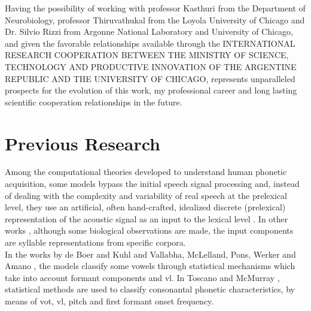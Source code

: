 \documentclass[11pt,a4paper]{article}
\begin{document}
Having the possibility of working with professor
Kasthuri from the Department of Neurobiology,
professor Thiruvathukal from the  Loyola University of Chicago and
Dr. Silvio Rizzi from Argonne National Laboratory and University of Chicago,
and given the favorable relationships available through the
INTERNATIONAL RESEARCH COOPERATION BETWEEN THE MINISTRY OF SCIENCE,
TECHNOLOGY AND PRODUCTIVE INNOVATION
OF THE ARGENTINE REPUBLIC
AND
THE UNIVERSITY OF CHICAGO,
represents unparalleled prospects for the
evolution of this work, my professional career
and long lasting scientific cooperation
relationships in the future. \\

























\section{Previous Research}

Among the computational theories developed to understand
human phonetic acquisition, some models bypass the initial
speech signal processing and,
instead of dealing with the complexity and variability of real speech
at the prelexical level, they use an artificial, often hand-crafted, 
idealized discrete (prelexical) representation of the acoustic
signal as an input to the lexical level \cite{scharenborg_2010}.
In other works \cite{dominey_2000}, although some biological observations are made,
the input components are syllable representations from specific corpora.\\

In the works by de Boer and Kuhl \cite{boer_2003} and Vallabha, McLelland, Pons,
Werker and Amano \cite{vallabha_2007}, the models classify some vowels
through statistical mechanisms which take into account formant components
and \gls{vl}.
In Toscano and McMurray \cite{toscano_2010},
statistical methods are used to classify consonantal phonetic
characteristics, by means of \gls{vot},
\gls{vl}, pitch and first formant onset frequency. \\
\end{document}
